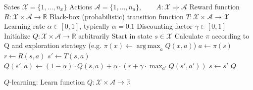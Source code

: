 \documentclass{article}
\DeclareMathOperator*{\argmax}{arg\,max}
\begin{document}
\begin{preview}
    \begin{algorithm}[H]
        \begin{algorithmic}
        \Require
        \Statex Sates $\mathcal{X} = \{1, \dots, n_x\}$
        \Statex Actions $\mathcal{A} = \{1, \dots, n_a\},\qquad A: \mathcal{X} \Rightarrow \mathcal{A}$
        \Statex Reward function $R: \mathcal{X} \times \mathcal{A} \rightarrow \mathbb{R}$
        \Statex Black-box (probabilistic) transition function $T: \mathcal{X} \times \mathcal{A} \rightarrow \mathcal{X}$
        \Statex Learning rate $\alpha \in [0, 1]$, typically $\alpha = 0.1$
        \Statex Discounting factor $\gamma \in [0, 1]$
            \State Initialize $Q: \mathcal{X} \times \mathcal{A} \rightarrow \mathbb{R}$ arbitrarily
                \State Start in state $s \in \mathcal{X}$
                    \State Calculate $\pi$ according to Q and exploration strategy (e.g. $\pi(x) \gets \argmax_{a} Q(x, a)$)
                    \State $a \gets \pi(s)$
                    \State $r \gets R(s, a)$ 
                    \State $s' \gets T(s, a)$ 
                    \State $Q(s', a) \gets (1 - \alpha) \cdot Q(s, a) + \alpha \cdot (r + \gamma \cdot \max_{a'} Q(s', a'))$
                    \State $s \gets s'$
                \EndWhile
            \EndWhile
            \Return $Q$
        \EndProcedure
        \end{algorithmic}
    \caption{$Q$-learning: Learn function $Q: \mathcal{X} \times \mathcal{A} \rightarrow \mathbb{R}$}
    \label{alg:q-learning}
    \end{algorithm}
\end{preview}
\end{document}
